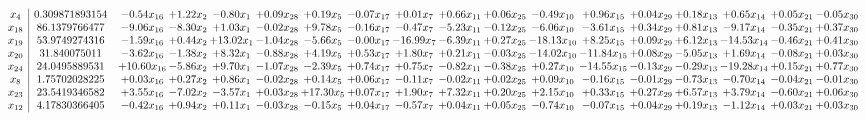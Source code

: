 \documentclass[9pt]{article}
\begin{document}
 \[\begin{array}{c| c c@{\hskip 2pt} c@{\hskip 2pt} c@{\hskip 2pt} c@{\hskip 2pt} c@{\hskip 2pt} c@{\hskip 2pt} c@{\hskip 2pt} c@{\hskip 2pt} c@{\hskip 2pt} c@{\hskip 2pt} c@{\hskip 2pt} c@{\hskip 2pt} c@{\hskip 2pt} c@{\hskip 2pt} c@{\hskip 2pt} c@{\hskip 2pt} }
 x_{4}   &  0.309871893154 & -0.54 x_{16} & +  1.22 x_{2} & -0.80 x_{1} & +  0.09 x_{28} & +  0.19 x_{5} & -0.07 x_{17} & +  0.01 x_{7} & +  0.66 x_{11} & +  0.06 x_{25} & -0.49 x_{10} & +  0.96 x_{15} & +  0.04 x_{29} & +  0.18 x_{13} & +  0.65 x_{14} & +  0.05 x_{21} & -0.05 x_{30}\\
 x_{18}   &  86.1379766477 & -9.06 x_{16} & -8.30 x_{2} & +  1.03 x_{1} & -0.02 x_{28} & +  9.78 x_{5} & -0.16 x_{17} & -0.47 x_{7} & -5.23 x_{11} & -0.12 x_{25} & -6.06 x_{10} & -3.61 x_{15} & +  0.34 x_{29} & +  0.81 x_{13} & -9.17 x_{14} & -0.35 x_{21} & +  0.37 x_{30}\\
 x_{19}   &  53.9749274316 & -1.59 x_{16} & +  0.44 x_{2} & + 13.02 x_{1} & -1.04 x_{28} & -5.66 x_{5} & -0.00 x_{17} & -16.99 x_{7} & -6.39 x_{11} & +  0.27 x_{25} & -18.13 x_{10} & +  8.25 x_{15} & +  0.09 x_{29} & +  6.12 x_{13} & -14.53 x_{14} & -0.46 x_{21} & +  0.41 x_{30}\\
 x_{20}   &  31.840075011 & -3.62 x_{16} & -1.38 x_{2} & +  8.32 x_{1} & -0.88 x_{28} & +  4.19 x_{5} & +  0.53 x_{17} & +  1.80 x_{7} & +  0.21 x_{11} & -0.03 x_{25} & -14.02 x_{10} & -11.84 x_{15} & +  0.08 x_{29} & -5.05 x_{13} & +  1.69 x_{14} & -0.08 x_{21} & +  0.03 x_{30}\\
 x_{24}   &  24.0495889531 & + 10.60 x_{16} & -5.86 x_{2} & +  9.70 x_{1} & -1.07 x_{28} & -2.39 x_{5} & +  0.74 x_{17} & +  0.75 x_{7} & -0.82 x_{11} & -0.38 x_{25} & +  0.27 x_{10} & -14.55 x_{15} & -0.13 x_{29} & -0.29 x_{13} & -19.28 x_{14} & +  0.15 x_{21} & +  0.77 x_{30}\\
 x_{8}   &  1.75702028225 & +  0.03 x_{16} & +  0.27 x_{2} & +  0.86 x_{1} & -0.02 x_{28} & +  0.14 x_{5} & +  0.06 x_{17} & -0.11 x_{7} & -0.02 x_{11} & +  0.02 x_{25} & +  0.09 x_{10} & -0.16 x_{15} & -0.01 x_{29} & -0.73 x_{13} & -0.70 x_{14} & -0.04 x_{21} & -0.01 x_{30}\\
 x_{23}   &  23.5419346582 & +  3.55 x_{16} & -7.02 x_{2} & -3.57 x_{1} & +  0.03 x_{28} & + 17.30 x_{5} & +  0.07 x_{17} & +  1.90 x_{7} & +  7.32 x_{11} & +  0.20 x_{25} & +  2.15 x_{10} & +  0.33 x_{15} & +  0.27 x_{29} & +  6.57 x_{13} & +  3.79 x_{14} & -0.60 x_{21} & +  0.06 x_{30}\\
 x_{12}   &  4.17830366405 & -0.42 x_{16} & +  0.94 x_{2} & +  0.11 x_{1} & -0.03 x_{28} & -0.15 x_{5} & +  0.04 x_{17} & -0.57 x_{7} & +  0.04 x_{11} & +  0.05 x_{25} & -0.74 x_{10} & -0.07 x_{15} & +  0.04 x_{29} & +  0.19 x_{13} & -1.12 x_{14} & +  0.03 x_{21} & +  0.03 x_{30}\\

\end{array}\]
\end{document}
